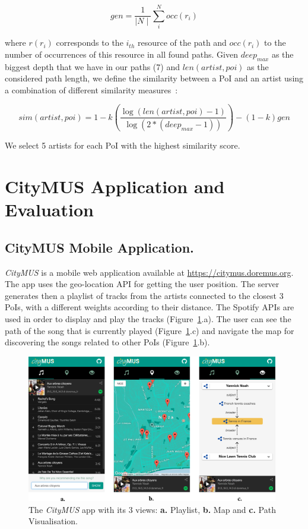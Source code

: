 \documentclass{llncs}
\newcommand\figref{Figure~\ref}
\begin{document}
$$gen =\frac{1}{\mid N \mid}\sum_i^Nocc(r_{i})$$

where $r(r_{i})$ corresponds to the $i_{th}$ resource of the path and $occ(r_{i})$ to the number of occurrences of this resource in all found paths. Given $deep_{max}$ as the biggest depth that we have in our paths (7) and $len(artist,poi)$ as the considered path length, we define the similarity between a PoI and an artist using a combination of different similarity measures~\cite{meng2013review}:

$$sim(artist,poi) = 1-k(\frac{\log(len(artist,poi)-1)}{\log(2*(deep_{max} -1))})-(1-k)gen$$

We select 5 artists for each PoI with the highest similarity score.


\section{CityMUS Application and Evaluation}
\label{sec:CityMUS}

\subsection*{CityMUS Mobile Application.}
\textit{CityMUS} is a mobile web application available at \url{https://citymus.doremus.org}. The app uses the geo-location API for getting the user position. The server generates then a playlist of tracks from the artists connected to the closest 3 PoIs, with a different weights according to their distance. The Spotify APIs are used in order to display and play the tracks (\figref{fig:screenshots}.a). The user can see the path of the song that is currently played (\figref{fig:screenshots}.c) and navigate the map for discovering the songs related to other PoIs (\figref{fig:screenshots}.b).

\begin{figure}
 \centerline{
 \includegraphics[width=11cm]{img/screenshots.png}}
 \caption{The \textit{CityMUS} app with its 3 views: \textbf{a.} Playlist, \textbf{b.} Map and \textbf{c.} Path Visualisation.}
 \label{fig:screenshots}
\end{figure}
\end{document}
